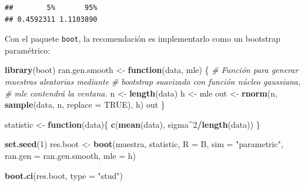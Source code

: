 \documentclass[]{book}
\newenvironment{Shaded}{\begin{snugshade}}{\end{snugshade}}
\newcommand{\KeywordTok}[1]{\textcolor[rgb]{0.13,0.29,0.53}{\textbf{#1}}}
\newcommand{\DataTypeTok}[1]{\textcolor[rgb]{0.13,0.29,0.53}{#1}}
\newcommand{\DecValTok}[1]{\textcolor[rgb]{0.00,0.00,0.81}{#1}}
\newcommand{\StringTok}[1]{\textcolor[rgb]{0.31,0.60,0.02}{#1}}
\newcommand{\CommentTok}[1]{\textcolor[rgb]{0.56,0.35,0.01}{\textit{#1}}}
\newcommand{\OtherTok}[1]{\textcolor[rgb]{0.56,0.35,0.01}{#1}}
\newcommand{\ControlFlowTok}[1]{\textcolor[rgb]{0.13,0.29,0.53}{\textbf{#1}}}
\newcommand{\OperatorTok}[1]{\textcolor[rgb]{0.81,0.36,0.00}{\textbf{#1}}}
\newcommand{\NormalTok}[1]{#1}
\theoremstyle{definition}
\theoremstyle{definition}
\theoremstyle{definition}
\theoremstyle{remark}
\begin{document}
\begin{Shaded}
\end{Shaded}

\begin{verbatim}
##        5%       95% 
## 0.4592311 1.1103890
\end{verbatim}

Con el paquete \texttt{boot}, la recomendación es implementarlo como un
bootstrap paramétrico:

\begin{Shaded}
\begin{Highlighting}[]
\KeywordTok{library}\NormalTok{(boot)}
\NormalTok{ran.gen.smooth <-}\StringTok{ }\ControlFlowTok{function}\NormalTok{(data, mle) \{}
    \CommentTok{# Función para generar muestras aleatorias mediante }
    \CommentTok{# bootstrap suavizado con función núcleo gaussiana,}
    \CommentTok{# mle contendrá la ventana.}
\NormalTok{    n <-}\StringTok{ }\KeywordTok{length}\NormalTok{(data)}
\NormalTok{    h <-}\StringTok{ }\NormalTok{mle}
\NormalTok{    out <-}\StringTok{ }\KeywordTok{rnorm}\NormalTok{(n, }\KeywordTok{sample}\NormalTok{(data, n, }\DataTypeTok{replace =} \OtherTok{TRUE}\NormalTok{), h)}
\NormalTok{    out}
\NormalTok{\}}

\NormalTok{statistic <-}\StringTok{ }\ControlFlowTok{function}\NormalTok{(data)\{}
    \KeywordTok{c}\NormalTok{(}\KeywordTok{mean}\NormalTok{(data), sigma}\OperatorTok{^}\DecValTok{2}\OperatorTok{/}\KeywordTok{length}\NormalTok{(data))}
\NormalTok{\}}

\KeywordTok{set.seed}\NormalTok{(}\DecValTok{1}\NormalTok{)}
\NormalTok{res.boot <-}\StringTok{ }\KeywordTok{boot}\NormalTok{(muestra, statistic, }\DataTypeTok{R =}\NormalTok{ B, }\DataTypeTok{sim =} \StringTok{"parametric"}\NormalTok{,}
                 \DataTypeTok{ran.gen =}\NormalTok{ ran.gen.smooth, }\DataTypeTok{mle =}\NormalTok{ h)}

\KeywordTok{boot.ci}\NormalTok{(res.boot, }\DataTypeTok{type =} \StringTok{"stud"}\NormalTok{)}
\end{Highlighting}
\end{Shaded}
\end{document}
